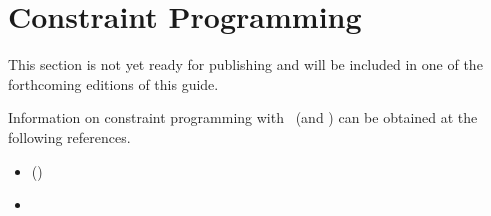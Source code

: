 \section{Constraint Programming}\label{sec:meta}

This section is not yet ready for publishing
and will be included in one of the forthcoming editions of this guide.

Information on constraint programming with \gringo\ (and \clingcon) can be obtained at the following references.

\begin{itemize}
\item \cite{} (\clingcon)
\item \tbf
\end{itemize}

